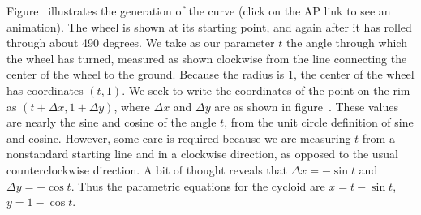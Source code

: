Figure~ illustrates the generation of the curve
(click on the AP link to see an animation). The wheel is shown at its
starting point, and again after it has rolled through about 490
degrees. We take as our parameter $t$ the angle through which the
wheel has turned, measured as shown clockwise from the line connecting
the center of the wheel to the ground. Because the radius is 1, the
center of the wheel has coordinates $(t,1)$. We seek to write the
coordinates of the point on the rim as $(t+\Delta x,1+\Delta y)$,
where $\Delta x$ and $\Delta y$ are as shown in figure~. These values are nearly the sine and cosine of the
angle $t$, from the unit circle definition of sine and
cosine. However, some care is required because we are measuring $t$
from a nonstandard starting line and in a clockwise direction, as
opposed to the usual counterclockwise direction. A bit of thought
reveals that $\Delta x=-\sin t$ and $\Delta y=-\cos t$. Thus the
parametric equations for the cycloid are $x=t-\sin t$, $y=1-\cos t$.
\endexample

